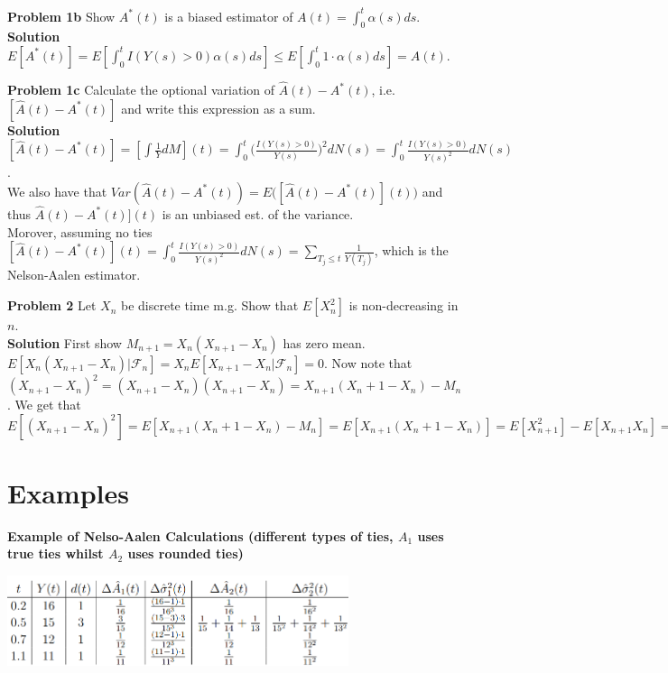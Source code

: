 \documentclass{article}
\begin{document}
\medskip

\textbf{Problem 1b} Show $A^*(t)$ is a biased estimator of $A(t) = \int_0^t\alpha(s)ds$. \\
\textbf{Solution} $E[A^*(t)] = E[\int_0^t I(Y(s)>0)\alpha(s)ds] \leq 
E[\int_0^t 1\cdot \alpha(s)ds] = A(t)$. 

\medskip

\textbf{Problem 1c} Calculate the optional variation of $\hat{A}(t)−A^*(t)$, i.e. $[\hat{A}(t)−A^*(t)]$ and write this expression as a sum. \\
\textbf{Solution} $[\hat{A}(t)−A^*(t)] = [\int \frac{1}{Y}dM](t) = \int_0^t \Big(\frac{I(Y(s)>0)}{Y(s)}\Big)^2 dN(s) = \int_0^t\frac{I(Y(s)>0)}{Y(s)^2} dN(s)$. \\ 
We also have that $Var( \hat{A}(t) - A^*(t)) = E\Big( [\hat{A}(t) - A^*(t)](t) \Big)$ and thus $\hat{A}(t) - A^*(t)](t)$ is an unbiased est. of the variance. \\ Morover, assuming no ties $[\hat{A}(t) - A^*(t)](t) = \int_0^t\frac{I(Y(s)>0)}{Y(s)^2} dN(s) = \sum_{T_j\leq t} \frac{1}{Y(T_j)}$, which is the Nelson-Aalen estimator.

\medskip

\textbf{Problem 2} Let $X_n$ be discrete time m.g. Show that $E[X^2_n]$ is non-decreasing in $n$.\\
\textbf{Solution} First show $M_{n+1} = X_n(X_{n+1}- X_n)$ has zero mean.  
$E[X_n(X_{n+1}- X_n)| \mathcal{F}_{n}] = X_n E[X_{n+1}- X_n| \mathcal{F}_{n}] = 0$. Now note that $(X_{n+1}- X_{n})^2 = (X_{n+1}- X_{n})(X_{n+1}- X_{n}) = X_{n+1}(X_{n}+ 1- X_{n}) - M_n$. We get that $E[(X_{n+1}- X_{n})^2] = E[ X_{n+1}(X_{n}+ 1- X_{n}) - M_n] = E[ X_{n+1}(X_{n}+ 1- X_{n})] = E[ X_{n+1}^2]- E[X_{n+1} X_{n}] = E[ X_{n+1}^2]- E[E[X_{n+1} X_{n} | \mathcal{F}_n]] =  E[ X_{n+1}^2]- E[ X_{n}^2 ] \geq 0$

\section*{Examples}

\textbf{Example of Nelso-Aalen Calculations (different types of ties, $A_1$ uses true ties whilst $A_2$ uses rounded ties)} 

\includegraphics[width=10cm]{surv_table.png}
\end{document}
